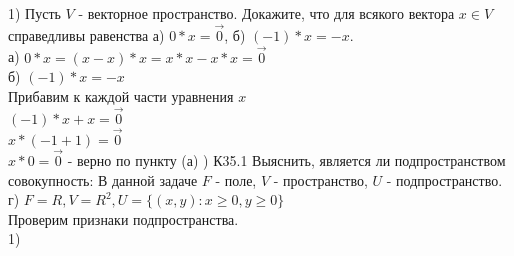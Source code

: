 \documentclass[12pt, a4paper]{article}
\begin{document}
	1) Пусть $V$ - векторное пространство. Докажите, что для всякого вектора $x \in V$ справедливы равенства а) $0 * x = \vec{0}$, б) $(-1) * x = -x$. \\

	а) $0 * x = (x - x) * x = x * x - x * x = \vec{0}$ \\
	
	б) $(-1) * x = -x$ \\
	
	Прибавим к каждой части уравнения $x$ \\
	
	$(-1) * x + x = \vec{0}$ \\
	
	$x * (-1 + 1) = \vec{0}$ \\
	
	$x * 0 = \vec{0}$ - верно по пункту (а) ) К35.1 Выяснить, является ли подпространством совокупность: \sspace
	В данной задаче $F$ - поле, $V$ - пространство, $U$ - подпространство. \\
	
	г) $F = R, V = R^2, U = \{(x, y): x \geq 0, y \geq 0\}$ \\ 
	Проверим признаки подпространства. \\
	1) 
	
	
\end{document}
